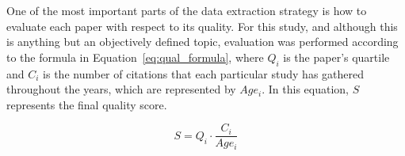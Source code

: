 One of the most important parts of the data extraction strategy is how
to evaluate each paper with respect to its quality. For this study, and
although this is anything but an objectively defined topic, evaluation
was performed according to the formula in
Equation~\ref{eq:qual_formula}, where $Q_i$ is the paper's quartile and
$C_i$ is the number of citations that each particular study has gathered
throughout the years, which are represented by $Age_i$. In this
equation, $S$ represents the final quality score.

\begin{equation}
    \label{eq:qual_formula}
    S = Q_{i} \cdot \frac{C_i}{Age_i}
\end{equation}







